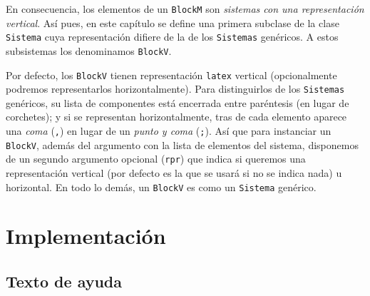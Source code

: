 \documentclass[11pt]{report}
\begin{document}
En consecuencia, los elementos de un \texttt{BlockM} son \emph{sistemas con una
representación vertical}. Así pues, en este capítulo se define una
primera subclase de la clase \texttt{Sistema} cuya representación difiere de
la de los \texttt{Sistemas} genéricos. A estos subsistemas los denominamos
\texttt{BlockV}.

Por defecto, los \texttt{BlockV} tienen representación \texttt{latex} vertical
(opcionalmente podremos representarlos horizontalmente). Para
distinguirlos de los \texttt{Sistemas} genéricos, su lista de componentes
está encerrada entre paréntesis (en lugar de corchetes); y si se
representan horizontalmente, tras de cada elemento aparece una \emph{coma}
(\texttt{,}) en lugar de un \emph{punto y coma} (\texttt{;}). Así que para instanciar un
\texttt{BlockV}, además del argumento con la lista de elementos del sistema,
disponemos de un segundo argumento opcional (\texttt{rpr}) que indica si
queremos una representación vertical (por defecto es la que se usará
si no se indica nada) u horizontal. En todo lo demás, un \texttt{BlockV} es
como un \texttt{Sistema} genérico.

\section{Implementación}
\label{sec:org5e2e8f2}

\subsection{Texto de ayuda}
\label{sec:orgaa2574b}
\end{document}
